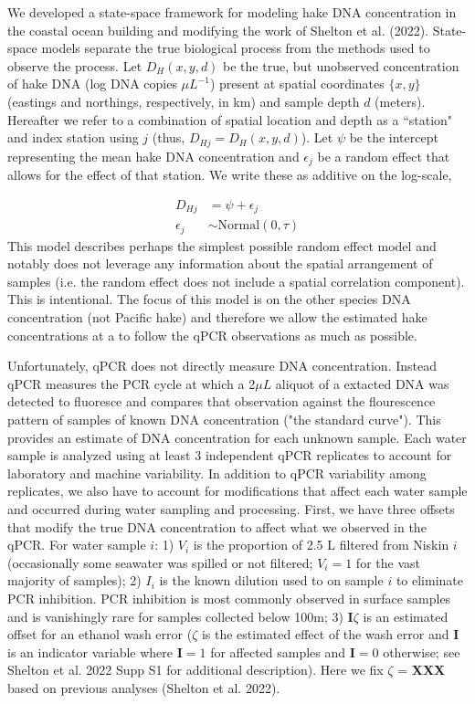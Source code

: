 \documentclass{article}
\begin{document}
We developed a state-space framework for modeling hake DNA concentration in the coastal ocean building and modifying the work of Shelton et al. (2022).  State-space models separate the true biological process from the methods used to observe the process. Let $D_H(x,y,d)$ be the true, but unobserved concentration of hake DNA (log DNA copies $\mu L^{-1}$) present at spatial coordinates $\{x,y\}$ (eastings and northings, respectively, in km) and sample depth $d$ (meters). Hereafter we refer to a combination of spatial location and depth as a ``station" and index station using $j$ (thus, $D_{Hj} = D_H(x,y,d)$). Let $\psi$ be the intercept representing the mean hake DNA concentration and $\epsilon_j$ be a random effect that allows for the effect of that station. We write these as additive on the log-scale,

\begin{align}
  D_{Hj} &= \psi + \epsilon_j \\
  \epsilon_j &\sim  \mathrm{Normal}(0,\tau)
\end{align}
This model describes perhaps the simplest possible random effect model and notably does not leverage any information about the spatial arrangement of samples (i.e. the random effect does not include a spatial correlation component).  This is intentional.  The focus of this model is on the other species DNA concentration (not Pacific hake) and therefore we allow the estimated hake concentrations at a to follow the qPCR observations as much as possible. 

Unfortunately, qPCR does not directly measure DNA concentration. Instead qPCR measures the PCR cycle at which a 2$\mu L$ aliquot of a extacted DNA was detected to fluoresce and compares that observation against the flourescence pattern of samples of known DNA concentration ("the standard curve"). This provides an estimate of DNA concentration for each unknown sample. Each water sample is analyzed using at least 3 independent qPCR replicates to account for laboratory and machine variability. In addition to qPCR variability among replicates, we also have to account for modifications that affect each water sample and occurred during water sampling and processing. First, we have three offsets that modify the true DNA concentration to affect what we observed in the qPCR. For water sample $i$: 1) $V_i$ is the proportion of 2.5 L filtered from Niskin $i$ (occasionally some seawater was spilled or not filtered; $V_i =1$ for the vast majority of samples); 2) $I_i$ is the known dilution used to on sample $i$ to eliminate PCR inhibition. PCR inhibition is most commonly observed in surface samples and is vanishingly rare for samples collected below 100m; 3) $\mathbf{I}\zeta$ is an estimated offset for an ethanol wash error ($\zeta$ is the estimated effect of the wash error and $\mathbf{I}$ is an indicator variable where $\mathbf{I}=1$ for affected samples and $\mathbf{I}=0$ otherwise; see Shelton et al. 2022 Supp S1 for additional description). Here we fix $\zeta$ = \textbf{XXX} based on previous analyses (Shelton et al. 2022).
\end{document}
